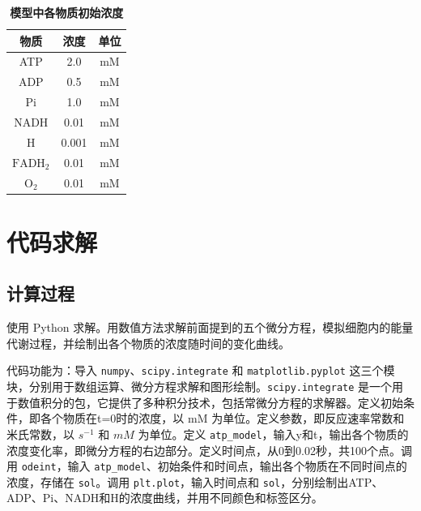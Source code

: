 \documentclass{ctexart}
\begin{document}
\begin{table}[H]
    \centering
    \begin{tabular}{ccc}
        \toprule%
        物质 & 浓度 & 单位\\
        \midrule%
        ATP & 2.0 & mM\\
        ADP & 0.5 & mM\\
        Pi & 1.0 & mM\\
        NADH & 0.01 & mM\\
        H & 0.001 & mM\\
        $\mathrm{FADH_2}$ & 0.01 & mM\\
        $\mathrm{O_2}$ & 0.01 & mM\\
        \bottomrule
    \end{tabular}
    \caption{\textbf{模型中各物质初始浓度}}
\end{table}

\section{代码求解}
\subsection{计算过程}

使用 Python 求解。用数值方法求解前面提到的五个微分方程，模拟细胞内的能量代谢过程，并绘制出各个物质的浓度随时间的变化曲线。

代码功能为：导入 \verb|numpy|、\verb|scipy.integrate| 和 \verb|matplotlib.pyplot| 这三个模块，分别用于数组运算、微分方程求解和图形绘制。\verb|scipy.integrate| 是一个用于数值积分的包，它提供了多种积分技术，包括常微分方程的求解器。定义初始条件，即各个物质在t=0时的浓度，以 mM 为单位。定义参数，即反应速率常数和米氏常数，以 $s^{-1}$ 和 $mM$ 为单位。定义 \verb|atp_model|，输入y和t，输出各个物质的浓度变化率，即微分方程的右边部分。定义时间点，从0到0.02秒，共100个点。调用 \verb|odeint|，输入 \verb|atp_model|、初始条件和时间点，输出各个物质在不同时间点的浓度，存储在 \verb|sol|。调用 \verb|plt.plot|，输入时间点和 \verb|sol|，分别绘制出ATP、ADP、Pi、NADH和H的浓度曲线，并用不同颜色和标签区分。
\end{document}
